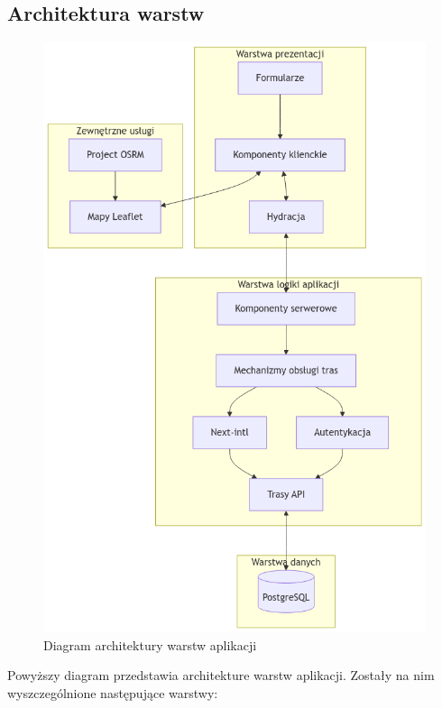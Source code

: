 \subsection{Architektura warstw}
\begin{figure}[H]
	\centering
		\includegraphics[width=1\linewidth]{rozdzial2/diagram_warstw.png}
	\caption{Diagram architektury warstw aplikacji}
	\label{Diagram warstw}
\end{figure}
Powyższy diagram przedstawia architekture warstw aplikacji. Zostały na nim wyszczególnione następujące warstwy:
